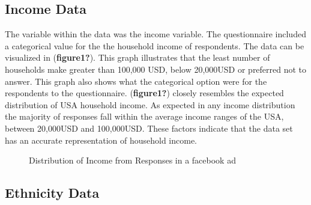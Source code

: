 \documentclass[
  letterpaper,
  DIV=11,
  numbers=noendperiod]{scrartcl}
\begin{document}
\subsection{Income Data}\label{sec-income_data}

The variable within the data was the income variable. The questionnaire
included a categorical value for the the household income of
respondents. The data can be visualized in (\textbf{figure1?}). This
graph illustrates that the least number of households make greater than
100,000 USD, below 20,000USD or preferred not to answer. This graph also
shows what the categorical option were for the respondents to the
questionnaire. (\textbf{figure1?}) closely resembles the expected
distribution of USA household income. As expected in any income
distribution the majority of responses fall within the average income
ranges of the USA, between 20,000USD and 100,000USD. These factors
indicate that the data set has an accurate representation of household
income.

\begin{figure}


\caption{\label{fig-figure1}Distribution of Income from Responses in a
facebook ad}

\end{figure}%

\subsection{Ethnicity Data}\label{sec-race_data}
\end{document}
